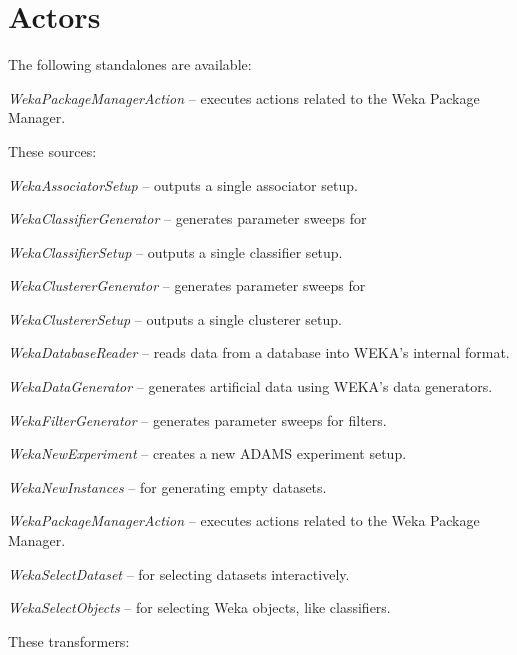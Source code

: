 \section{Actors}
The following standalones are available:
\begin{tight_itemize}
	\item \textit{WekaPackageManagerAction} -- executes actions related to the Weka Package Manager.
\end{tight_itemize}
These sources:
\begin{tight_itemize}
	\item \textit{WekaAssociatorSetup} -- outputs a single associator setup.
	\item \textit{WekaClassifierGenerator} -- generates parameter sweeps for
	\item \textit{WekaClassifierSetup} -- outputs a single classifier setup.
	\item \textit{WekaClustererGenerator} -- generates parameter sweeps for
	\item \textit{WekaClustererSetup} -- outputs a single clusterer setup.
	\item \textit{WekaDatabaseReader} -- reads data from a database into
	WEKA's internal format.
	\item \textit{WekaDataGenerator} -- generates artificial data using WEKA's
	data generators.
	\item \textit{WekaFilterGenerator} -- generates parameter sweeps for
	filters.
	\item \textit{WekaNewExperiment} -- creates a new ADAMS experiment setup.
	\item \textit{WekaNewInstances} -- for generating empty datasets.
	\item \textit{WekaPackageManagerAction} -- executes actions related to the Weka Package Manager.
	\item \textit{WekaSelectDataset} -- for selecting datasets interactively.
	\item \textit{WekaSelectObjects} -- for selecting Weka objects, like
	classifiers.
\end{tight_itemize}
These transformers:
